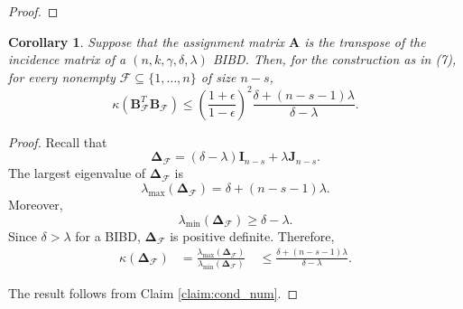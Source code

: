 \documentclass[journal,draftcls,onecolumn]{IEEEtran}
\theoremstyle{mystyle}
\newtheorem{cor}{Corollary}
\begin{document}
\begin{proof}


\end{proof}
\begin{cor}
Suppose that the assignment matrix $\mathbf{A}$ is the transpose of the incidence matrix of a $(n,k,\gamma,\delta,\lambda)$ BIBD. Then, for the construction as in (7), for every nonempty $\mathcal{F}\subseteq\{1,\ldots,n\}$ of size $n-s$,
$$
\kappa\left(\mathbf{B}_{\mathcal{F}}^T
\mathbf{B}_{\mathcal{F}}\right)
\leq
\left(\frac{1+\epsilon}{1-\epsilon}\right)^2
\frac{\delta+(n-s-1)\lambda}{\delta-\lambda}.
$$
\end{cor}

\begin{proof}
Recall that
$$
\mathbf{\Delta}_{\mathcal{F}}
= (\delta-\lambda)\mathbf{I}_{n-s}
+\lambda\mathbf{J}_{n-s}.$$
The largest eigenvalue of $\mathbf{\Delta}_{\mathcal{F}}$ is
$$
\lambda_{\max} \left(\mathbf{\Delta}_{\mathcal{F}}\right)
= \delta+(n-s-1)\lambda.
$$
Moreover,
$$
\lambda_{\min}\left(\mathbf{\Delta}_{\mathcal{F}}\right)
\geq
\delta-\lambda.
$$
Since $\delta>\lambda$ for a BIBD, $\mathbf{\Delta}_{\mathcal{F}}$ is positive definite. Therefore,
$$
\begin{aligned}
\kappa\left(\mathbf{\Delta}_{\mathcal{F}}\right)
&=
\frac{
\lambda_{\max}\left(\mathbf{\Delta}_{\mathcal{F}}\right)
}{
\lambda_{\min}\left(\mathbf{\Delta}_{\mathcal{F}}\right)
}
\
&\leq
\frac{\delta+(n-s-1)\lambda}{\delta-\lambda}.
\end{aligned}
$$

The result follows from Claim \ref{claim:cond_num}.
\end{proof}
\end{document}
